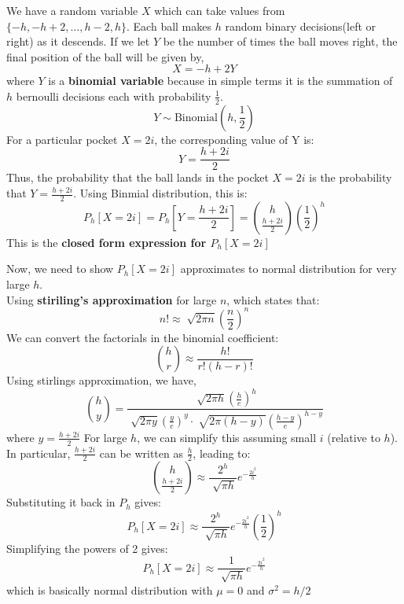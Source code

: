 \begin{solution}
		We have a random variable $X$ which can take values from $\{-h,-h+2,\ldots,h-2,h\}$. Each ball makes $h$ random binary decisions(left or right) as it descends. If we let $Y$ be the number of times the ball moves right, the final position of the ball will be given by,
		\[X = -h+2Y\]
		where $Y$ is a \textbf{binomial variable} because in simple terms it is the summation of $h$ bernoulli decisions each with probability $\frac{1}{2}$. 
		\[Y \sim \text{Binomial}(h,\frac{1}{2})\]
		For a particular pocket $X = 2i$, the corresponding value of Y is:
		\[Y = \frac{h+2i}{2}\]
		Thus, the probability that the ball lands in the pocket $X=2i$ is the probability that $Y = \frac{h+2i}{2}$. Using Binmial distribution, this is:
		\[P_h[X=2i]=P_h\left[Y=\frac{h+2i}{2}\right]=\binom{h}{\frac{h+2i}{2}}\left(\frac{1}{2}\right)^h\]
		This is the \textbf{closed form expression for $P_h[X=2i]$}

		Now, we need to show $P_h[X=2i]$ approximates to normal distribution for very large $h$.\\
		Using \textbf{stiriling's approximation} for large $n$, which states that:
		\[n!\approx \sqrt[]{2\pi n}\left(\frac{n}{2}\right)^n\]
		We can convert the factorials in the binomial coefficient:
		\[\binom{h}{r} \approx \frac{h!}{r!(h-r)!}\]
		Using stirlings approximation, we have,
		\[\binom{h}{y} = \frac{\sqrt[]{2\pi h}\left(\frac{h}{e}\right)^h}{\sqrt[]{2\pi y}\left(\frac{y}{e}\right)^y\cdot \sqrt[]{2\pi(h-y)}\left(\frac{h-y}{e}\right)^{h-y}}\]
		where $y = \frac{h+2i}{2}$ 
		For large $h$, we can simplify this assuming small $i$ (relative to $h$). In particular, $\frac{h+2i}{2}$ can be written as $\frac{h}{2}$, leading to:
		\[\binom{h}{\frac{h+2i}{2}} \approx \frac{2^h}{\sqrt[]{\pi h}}e^{-\frac{2i^2}{h}}\]
		Substituting it back in $P_h$ gives:
		\[P_h[X=2i]\approx \frac{2^h}{\sqrt[]{\pi h}}e^{-\frac{2i^2}{h}}\left(\frac{1}{2}\right)^h \]
		Simplifying the powers of 2 gives:
		\[P_h[X=2i]\approx \frac{1}{\sqrt[]{\pi h}}e^{-\frac{2i^2}{h}} \]
		which is basically normal distribution with $\mu = 0$ and $\sigma^2=h/2$
\end{solution}

